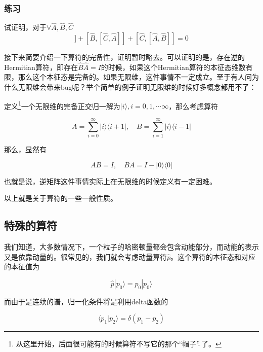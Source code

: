 \subsubsection{练习}
试证明，对于$\forall \hat{A}, \hat{B}, \hat{C}$
\begin{equation}
[\hat{A},[\hat{B},\hat{C}]] + [\hat{B},[\hat{C},\hat{A}]] + [\hat{C},[\hat{A},\hat{B}]] = 0
\end{equation}

接下来简要介绍一下算符的完备性，证明暂时略去。可以证明的是，存在逆的Hermitian算符，即存在$\hat{B}\hat{A} = I$的时候，如果这个Hermitian算符的本征态维数有限，那么这个本征态是完备的。如果无限维，这件事情不一定成立。至于有人问为什么无限维会带来bug呢？举个简单的例子证明无限维的时候好多概念都用不了：

\begin{exam}
定义\footnote{从这里开始，后面很可能有的时候算符不写它的那个“帽子”$\hat{\ }$了。}一个无限维的完备正交归一解为$|i\rangle, i = 0, 1, \cdots \infty$，那么考虑算符

\begin{equation}
A =  \sum_{i = 0}^{\infty} |i\rangle\langle i+1|,\quad B = \sum_{i = 1}^{\infty}|i\rangle\langle i-1|
\end{equation}

那么，显然有

\begin{equation}
AB = I,\quad BA = I - |0\rangle\langle0|
\end{equation}

也就是说，逆矩阵这件事情实际上在无限维的时候定义有一定困难。
\end{exam}

以上就是关于算符的一些一般性质。\\

\subsection{特殊的算符}

我们知道，大多数情况下，一个粒子的哈密顿量都会包含动能部分，而动能的表示又是依靠动量的。很常见的，我们就会考虑动量算符$\hat p$。这个算符的本征态和对应的本征值为

\begin{equation}
\hat p|p_0\rangle = p_0 |p_0\rangle
\end{equation}

而由于是连续的谱，归一化条件将是利用delta函数的

\begin{equation}
\langle p_1|p_2\rangle = \delta(p_1-p_2)
\end{equation}


